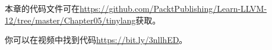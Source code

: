 本章的代码文件可在\url{https://github.com/PacktPublishing/Learn-LLVM-12/tree/master/Chapter05/tinylang}获取。\par

你可以在视频中找到代码\url{https://bit.ly/3nllhED}。\par